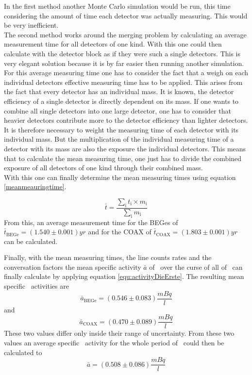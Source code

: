\documentclass[encoding=utf8,british]{tumphthesis}
\begin{document}
In the first method another Monte Carlo simulation would be run, this time considering the amount of time each detector was actually measuring.
This would be very inefficient.
\\

The second method works around the merging problem by calculating an average measurement time for all detectors of one kind.
With this one could then calculate with the detector block as if they were such a single detectors.
This is very elegant solution because it is by far easier then running another simulation.
\\

For this average measuring time one has to consider the fact that a weigh on each individual detectors effective measuring time has to be applied.
This arises from the fact that every detector has an individual mass.
It is known, the detector efficiency of a single detector is directly dependent on its mass.
If one wants to combine all single detectors into one large detector, one has to consider that heavier detectors contribute more to the detector efficiency than lighter detectors.
It is therefore necessary to weight the measuring time of each detector with its individual mass.
But the multiplication of the individual measuring time of a detector with its mass are also the exposure the individual detectors.
This means that to calculate the mean measuring time, one just has to divide the combined exposure of all detectors of one kind through their combined mass.
\\

With this one can finally determine the mean measuring times using equation \ref{meanmeauringtime}.

\begin{equation*}
    \bar{t} = \frac{\sum_\mathrm{i} t_\mathrm{i} \times m_\mathrm{i}}{\sum_\mathrm{i} m_\mathrm{i}}
\label{meanmeauringtime}
\end{equation*}
From this, an average measurement time for the BEGes of $\bar{t}_{\mathrm{BEGe}} = (1.540\pm0.001)\unit{yr}$ and for the COAX of $\bar{t}_{\mathrm{COAX}} = (1.803\pm0.001)\unit{yr}$ can be calculated.
\\
\fi

Finally, with the mean measuring times, the line counts rates and the conversation factors the mean specific activity $\bar{a}$ of \Kr\ over the curse of all of \PII\ can  finally calculate by applying equation \ref{equ:activityDieErste}.
The resulting mean specific \Kr\ activities are
\begin{equation*}
    \bar{a}_{\mathrm{BEGe}} = (0.546\pm0.083)	\frac{\unit{mBq}}{\unit{l}}
\end{equation*}
and
\begin{equation*}
    \bar{a}_{\mathrm{COAX}} = (0.470\pm0.089)	\frac{\unit{mBq}}{\unit{l}}
\end{equation*}
These two values differ only inside their range of uncertainty.
From these two values an average specific \Kr\ activity for the whole period of \PII\ could then be calculated to
\begin{equation*}
\bar{a} = (0.508\pm0.086)\frac{\unit{mBq}}{\unit{l}}
\end{equation*}
\\
\end{document}
